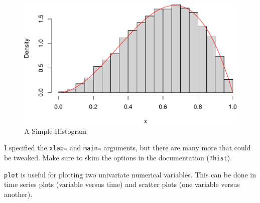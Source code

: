 \documentclass[
  12pt,
]{krantz}
\makeatletter
\newenvironment{Shaded}{\begin{snugshade}}{\end{snugshade}}
\newcommand{\AttributeTok}[1]{\textcolor[rgb]{0.61,0.61,0.61}{#1}}
\newcommand{\DecValTok}[1]{\textcolor[rgb]{0.06,0.06,0.06}{#1}}
\newcommand{\FunctionTok}[1]{\textcolor[rgb]{0,0,0}{#1}}
\newcommand{\NormalTok}[1]{#1}
\newcommand{\SpecialCharTok}[1]{\textcolor[rgb]{0,0,0}{#1}}
\newcommand{\StringTok}[1]{\textcolor[rgb]{0.5,0.5,0.5}{#1}}
\newenvironment{kframe}{%
\medskip{}
\setlength{\fboxsep}{.8em}
 \def\at@end@of@kframe{}%
 \ifinner\ifhmode%
  \def\at@end@of@kframe{\end{minipage}}%
  \begin{minipage}{\columnwidth}%
 \fi\fi%
 \def\FrameCommand##1{\hskip\@totalleftmargin \hskip-\fboxsep
 \colorbox{shadecolor}{##1}\hskip-\fboxsep
     \hskip-\linewidth \hskip-\@totalleftmargin \hskip\columnwidth}%
 \MakeFramed {\advance\hsize-\width
   \@totalleftmargin\z@ \linewidth\hsize
   \@setminipage}}%
 {\par\unskip\endMakeFramed%
 \at@end@of@kframe}
\renewenvironment{Shaded}{\begin{kframe}}{\end{kframe}}
\makeatother
\begin{document}
\begin{figure}
\centering
\includegraphics{r_and_python_book_files/figure-latex/unnamed-chunk-166-1.pdf}
\caption{\label{fig:unnamed-chunk-166}A Simple Histogram}
\end{figure}

I specified the \texttt{xlab=} and \texttt{main=} arguments, but there are many more that could be tweaked. Make sure to skim the options in the documentation (\texttt{?hist}).

\texttt{plot} is useful for plotting two univariate numerical variables. This can be done in time series plots (variable versus time) and scatter plots (one variable versus another).

\begin{Shaded}
\end{Shaded}
\end{document}
